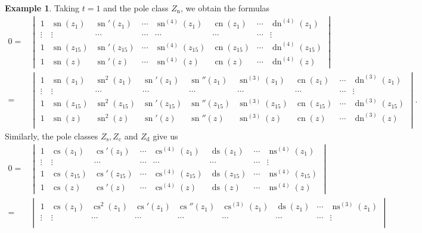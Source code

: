 \documentclass{amsart}
\theoremstyle{definition}
\newtheorem{example}[theorem]{Example}
\DeclareMathOperator{\ns}{ns}
\DeclareMathOperator{\dn}{dn}
\DeclareMathOperator{\ds}{ds}
\DeclareMathOperator{\cs}{cs}
\DeclareMathOperator{\sn}{sn}
\DeclareMathOperator{\cn}{cn}
\DeclareMathOperator{\s}{s}
\DeclareMathOperator{\cJ}{c}
\DeclareMathOperator{\dJ}{d}
\DeclareMathOperator{\n}{n}
\begin{document}
\begin{example}
    Taking $t=1$ and the pole class $Z_{\n}$, we obtain the formulas
    \begin{align*}
        0=&\begin{vmatrix}
1&\sn(z_1) & \sn'(z_1) & \cdots & \sn^{(4)}(z_1) &\cn(z_1) &\cdots &   \dn^{(4)}(z_1) \\
 \vdots&\vdots & \cdots  &  \cdots & \cdots & \cdots & \cdots & \vdots \\
1&\sn(z_{15}) & \sn'(z_{15}) & \cdots & \sn^{(4)}(z_{15}) &\cn(z_{15}) &\cdots &   \dn^{(4)}(z_{15}) \\
1&\sn(z) & \sn'(z) & \cdots & \sn^{(4)}(z) &\cn(z) &\cdots &   \dn^{(4)}(z) 
\end{vmatrix}\\
=&\begin{vmatrix}
1&\sn(z_1) &\sn^2(z_1) & \sn'(z_1) & \sn''(z_1) & \sn^{(3)}(z_1) &\cn(z_1) &\cdots &   \dn^{(3)}(z_1) \\
 \vdots&\vdots & \cdots  &  \cdots & \cdots & \cdots & \cdots &\cdots & \vdots \\
1&\sn(z_{15}) &\sn^2(z_{15}) & \sn'(z_{15}) & \sn''(z_{15}) & \sn^{(3)}(z_{15}) &\cn(z_{15}) &\cdots &   \dn^{(3)}(z_{15}) \\
1&\sn(z) &\sn^2(z) & \sn'(z) & \sn''(z) & \sn^{(3)}(z) &\cn(z) &\cdots &   \dn^{(3)}(z) \\
\end{vmatrix}.
    \end{align*}
Similarly, the pole classes $Z_{\s},Z_{\cJ}$ and $Z_{\dJ}$ give us
\begin{align*}
     0=&\begin{vmatrix}
1&\cs(z_1) & \cs'(z_1) & \cdots & \cs^{(4)}(z_1) &\ds(z_1) &\cdots &   \ns^{(4)}(z_1) \\
 \vdots&\vdots & \cdots  &  \cdots & \cdots & \cdots & \cdots & \vdots \\
1&\cs(z_{15}) & \cs'(z_{15}) & \cdots & \cs^{(4)}(z_{15}) &\ds(z_{15}) &\cdots &   \ns^{(4)}(z_{15}) \\
1&\cs(z) & \cs'(z) & \cdots & \cs^{(4)}(z) &\ds(z) &\cdots &   \ns^{(4)}(z)
\end{vmatrix}\\
=&\begin{vmatrix}
1&\cs(z_1) &\cs^2(z_1) & \cs'(z_1) & \cs''(z_1) & \cs^{(3)}(z_1) &\ds(z_1) &\cdots &   \ns^{(3)}(z_1) \\
 \vdots&\vdots & \cdots  &  \cdots & \cdots & \cdots & \cdots &\cdots & \vdots \\

\end{vmatrix}
\end{align*}
\end{example}
\end{document}
